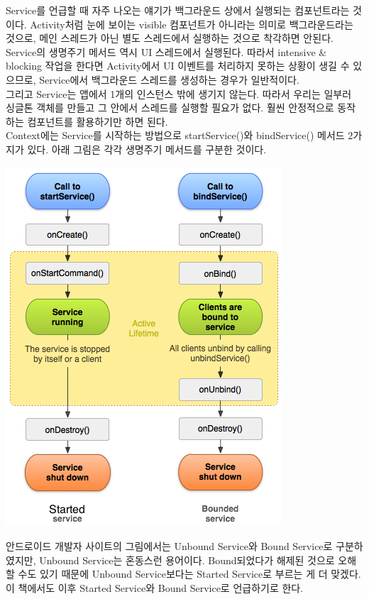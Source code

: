 Service를 언급할 때 자주 나오는 얘기가 백그라운드 상에서 실행되는 컴포넌트라는 것이다. Activity처럼 눈에 보이는 visible 컴포넌트가 아니라는 의미로 백그라운드라는 것으로, 메인 스레드가 아닌 별도 스레드에서 실행하는 것으로 착각하면 안된다.
Service의 생명주기 메서드 역시 UI 스레드에서 실행된다. 
따라서 intensive \& blocking 작업을 한다면 Activity에서 UI 이벤트를 처리하지 못하는 상황이 생길 수 있으므로, Service에서 백그라운드 스레드를 생성하는 경우가 일반적이다.\\

그리고 Service는 앱에서 1개의 인스턴스 밖에 생기지 않는다. 따라서 우리는 일부러 싱글톤 객체를 만들고 그 안에서 스레드를 실행할 필요가 없다. 훨씬 안정적으로 동작하는 컴포넌트를 활용하기만 하면 된다.\\

Context에는 Service를 시작하는 방법으로 startService()와 bindService() 메서드 2가지가 있다. 아래 그림은 각각 생명주기 메서드를 구분한 것이다. 

\includegraphics[scale=0.7]{service-lifecycle}

안드로이드 개발자 사이트의 그림에서는 Unbound Service와 Bound Service로 구분하였지만, Unbound Service는 혼동스런 용어이다. 
Bound되었다가 해제된 것으로 오해할 수도 있기 때문에 Unbound Service보다는 Started Service로 부르는 게 더 맞겠다. 
이 책에서도 이후 Started Service와 Bound Service로 언급하기로 한다.\\


